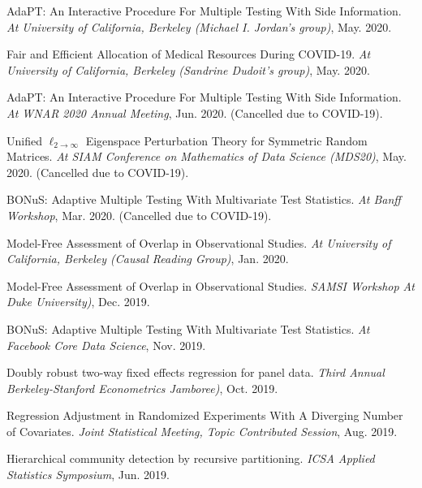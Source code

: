 \documentclass{article}
\begin{document}
\vspace{2mm}
AdaPT: An Interactive Procedure For Multiple Testing With Side Information. \emph{At University of California, Berkeley (Michael I. Jordan's group)}, May. 2020. 

\vspace{2mm}
Fair and Efficient Allocation of Medical Resources During COVID-19. \emph{At University of California, Berkeley (Sandrine Dudoit's group)}, May. 2020. 

\vspace{2mm}
AdaPT: An Interactive Procedure For Multiple Testing With Side Information. \emph{At WNAR 2020 Annual Meeting}, Jun. 2020. (Cancelled due to COVID-19).

\vspace{2mm}
Unified $\ell_{2\rightarrow\infty}$ Eigenspace Perturbation Theory for Symmetric Random Matrices. \emph{At SIAM Conference on Mathematics of Data Science (MDS20)}, May. 2020. (Cancelled due to COVID-19).

\vspace{2mm}
BONuS: Adaptive Multiple Testing With Multivariate Test Statistics. \emph{At Banff Workshop}, Mar. 2020. (Cancelled due to COVID-19).

\vspace{2mm}
Model-Free Assessment of Overlap in Observational Studies. \emph{At University of California, Berkeley (Causal Reading Group)}, Jan. 2020.

\vspace{2mm}
Model-Free Assessment of Overlap in Observational Studies. \emph{SAMSI Workshop At Duke University)}, Dec. 2019.

\vspace{2mm}
BONuS: Adaptive Multiple Testing With Multivariate Test Statistics. \emph{At Facebook Core Data Science}, Nov. 2019.

\vspace{2mm}
Doubly robust two-way fixed effects regression for panel data. \emph{Third Annual Berkeley-Stanford Econometrics Jamboree)}, Oct. 2019.

\vspace{2mm}
Regression Adjustment in Randomized Experiments With A Diverging Number of Covariates. \emph{Joint Statistical Meeting, Topic Contributed Session}, Aug. 2019.

\vspace{2mm}
Hierarchical community detection by recursive partitioning. \emph{ICSA Applied Statistics Symposium}, Jun. 2019.
\end{document}
